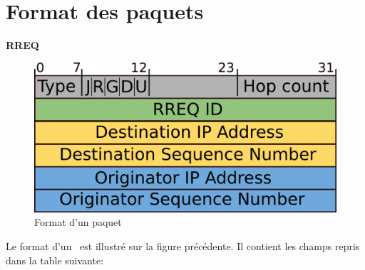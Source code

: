     \section{Format des paquets}
        \textbf{RREQ}\\
            \begin{figure}[H]
                \centering
                \includegraphics[scale=0.5]{images/rreq.png}
                \caption{Format d'un paquet \rreq\ \cite{rfc_aodv}}
                \label{rreqPaquet}
            \end{figure}
            Le format d'un \rreq\ est illustré sur la figure précédente. Il contient les champs
            repris dans la table suivante:\\

